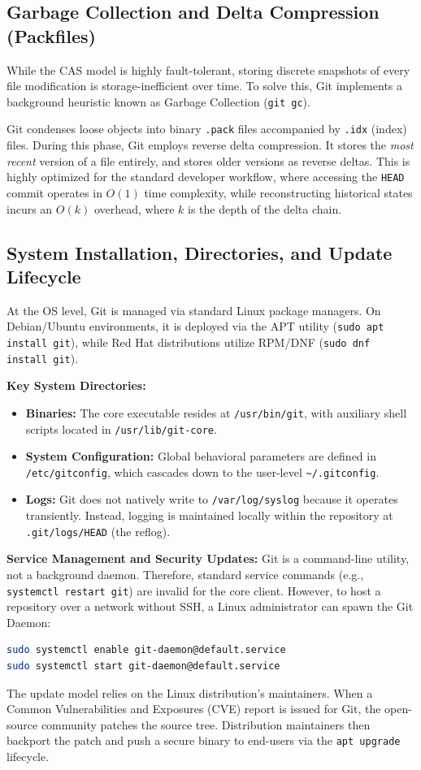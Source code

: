 \subsection{Garbage Collection and Delta Compression (Packfiles)}
While the CAS model is highly fault-tolerant, storing discrete snapshots of every file modification is storage-inefficient over time. To solve this, Git implements a background heuristic known as Garbage Collection (\texttt{git gc}).

Git condenses loose objects into binary \texttt{.pack} files accompanied by \texttt{.idx} (index) files. During this phase, Git employs reverse delta compression. It stores the \textit{most recent} version of a file entirely, and stores older versions as reverse deltas. This is highly optimized for the standard developer workflow, where accessing the \texttt{HEAD} commit operates in $O(1)$ time complexity, while reconstructing historical states incurs an $O(k)$ overhead, where $k$ is the depth of the delta chain.

\subsection{System Installation, Directories, and Update Lifecycle}
At the OS level, Git is managed via standard Linux package managers. On Debian/Ubuntu environments, it is deployed via the APT utility (\texttt{sudo apt install git}), while Red Hat distributions utilize RPM/DNF (\texttt{sudo dnf install git}). 

\textbf{Key System Directories:}
\begin{itemize}
    \item \textbf{Binaries:} The core executable resides at \texttt{/usr/bin/git}, with auxiliary shell scripts located in \texttt{/usr/lib/git-core}.
    \item \textbf{System Configuration:} Global behavioral parameters are defined in \texttt{/etc/gitconfig}, which cascades down to the user-level \texttt{\textasciitilde/.gitconfig}.
    \item \textbf{Logs:} Git does not natively write to \texttt{/var/log/syslog} because it operates transiently. Instead, logging is maintained locally within the repository at \texttt{.git/logs/HEAD} (the reflog).
\end{itemize}

\textbf{Service Management and Security Updates:}
Git is a command-line utility, not a background daemon. Therefore, standard service commands (e.g., \texttt{systemctl restart git}) are invalid for the core client. However, to host a repository over a network without SSH, a Linux administrator can spawn the Git Daemon:
\begin{lstlisting}[language=bash]
sudo systemctl enable git-daemon@default.service
sudo systemctl start git-daemon@default.service
\end{lstlisting}
The update model relies on the Linux distribution's maintainers. When a Common Vulnerabilities and Exposures (CVE) report is issued for Git, the open-source community patches the source tree. Distribution maintainers then backport the patch and push a secure binary to end-users via the \texttt{apt upgrade} lifecycle.

